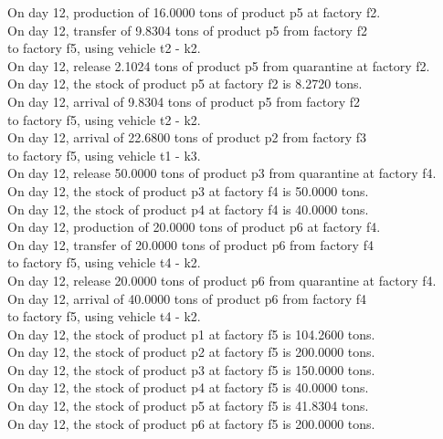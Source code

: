 \begin{table}[H]
\begin{multicols}{2}
\begin{tabbing}
On day 12, production of 16.0000 tons of product p5 at factory f2. \\
On day 12, transfer of 9.8304 tons of product p5 from factory f2 \\ to factory f5, using vehicle t2 - k2. \\
On day 12, release 2.1024 tons of product p5 from quarantine at factory f2. \\
On day 12, the stock of product p5 at factory f2 is 8.2720 tons. \\
On day 12, arrival of 9.8304 tons of product p5 from factory f2 \\ to factory f5, using vehicle t2 - k2. \\
On day 12, arrival of 22.6800 tons of product p2 from factory f3 \\ to factory f5, using vehicle t1 - k3. \\
On day 12, release 50.0000 tons of product p3 from quarantine at factory f4. \\
On day 12, the stock of product p3 at factory f4 is 50.0000 tons. \\
On day 12, the stock of product p4 at factory f4 is 40.0000 tons. \\
On day 12, production of 20.0000 tons of product p6 at factory f4. \\
On day 12, transfer of 20.0000 tons of product p6 from factory f4 \\ to factory f5, using vehicle t4 - k2. \\
On day 12, release 20.0000 tons of product p6 from quarantine at factory f4. \\
On day 12, arrival of 40.0000 tons of product p6 from factory f4 \\ to factory f5, using vehicle t4 - k2. \\
On day 12, the stock of product p1 at factory f5 is 104.2600 tons. \\
On day 12, the stock of product p2 at factory f5 is 200.0000 tons. \\
On day 12, the stock of product p3 at factory f5 is 150.0000 tons. \\
On day 12, the stock of product p4 at factory f5 is 40.0000 tons. \\
On day 12, the stock of product p5 at factory f5 is 41.8304 tons. \\
On day 12, the stock of product p6 at factory f5 is 200.0000 tons. \\
\end{tabbing} 
\vspace{-2.0em}
    \end{multicols} \\
    \bottomrule
\end{table}

